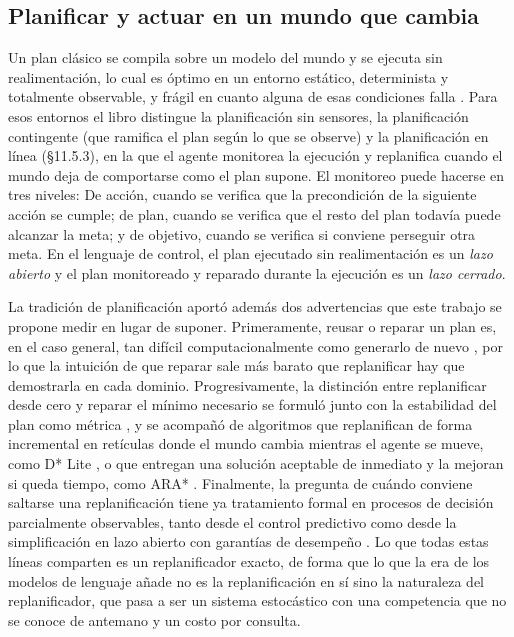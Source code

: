 \subsection{Planificar y actuar en un mundo que cambia}

Un plan clásico se compila sobre un modelo del mundo y se ejecuta sin realimentación, lo cual es óptimo en un entorno estático, determinista y totalmente observable, y frágil en cuanto alguna de esas condiciones falla \parencite[§11.5]{russellNorvig2020}. Para esos entornos el libro distingue la planificación sin sensores, la planificación contingente (que ramifica el plan según lo que se observe) y la planificación en línea (§11.5.3), en la que el agente monitorea la ejecución y replanifica cuando el mundo deja de comportarse como el plan supone. El monitoreo puede hacerse en tres niveles: De acción, cuando se verifica que la precondición de la siguiente acción se cumple; de plan, cuando se verifica que el resto del plan todavía puede alcanzar la meta; y de objetivo, cuando se verifica si conviene perseguir otra meta. En el lenguaje de control, el plan ejecutado sin realimentación es un \emph{lazo abierto} y el plan monitoreado y reparado durante la ejecución es un \emph{lazo cerrado}.

La tradición de planificación aportó además dos advertencias que este trabajo se propone medir en lugar de suponer. Primeramente, reusar o reparar un plan es, en el caso general, tan difícil computacionalmente como generarlo de nuevo \parencite{nebel1995plan}, por lo que la intuición de que reparar sale más barato que replanificar hay que demostrarla en cada dominio. Progresivamente, la distinción entre replanificar desde cero y reparar el mínimo necesario se formuló junto con la estabilidad del plan como métrica \parencite{fox2006plan}, y se acompañó de algoritmos que replanifican de forma incremental en retículas donde el mundo cambia mientras el agente se mueve, como D* Lite \parencite{koenig2002dlite}, o que entregan una solución aceptable de inmediato y la mejoran si queda tiempo, como ARA* \parencite{likhachev2003ara}. Finalmente, la pregunta de cuándo conviene saltarse una replanificación tiene ya tratamiento formal en procesos de decisión parcialmente observables, tanto desde el control predictivo \parencite{ma2018performance} como desde la simplificación en lazo abierto con garantías de desempeño \parencite{kong2026open}. Lo que todas estas líneas comparten es un replanificador exacto, de forma que lo que la era de los modelos de lenguaje añade no es la replanificación en sí sino la naturaleza del replanificador, que pasa a ser un sistema estocástico con una competencia que no se conoce de antemano y un costo por consulta.

